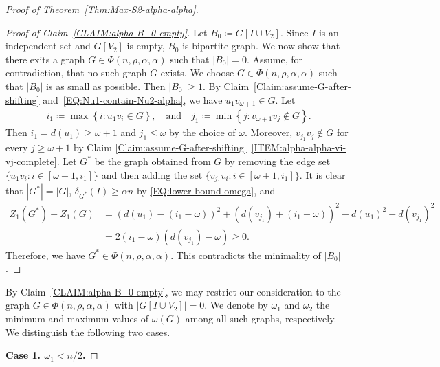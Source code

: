 \documentclass[11pt,a4paper]{article}
\begin{document}
\begin{proof}[Proof of Theorem~\ref{Thm:Max-S2-alpha-alpha}]
\begin{proof}[Proof of Claim~\ref{CLAIM:alpha-B_0-empty}]
Let $B_0\coloneqq  G[I\cup V_2]$. 
Since $I$ is an independent set and $G[V_2]$ is empty, $B_0$ is bipartite graph. 
We now show that there exits a graph $G \in \Phi(n, \rho, \alpha, \alpha)$ such that $|B_0| = 0$. 
Assume, for contradiction, that no such graph $G$ exists. 
We choose $G\in \Phi(n, \rho, \alpha, \alpha)$ such that $|B_0|$ is as small as possible. Then $|B_0|\ge 1$. 
By Claim~\ref{Claim:assume-G-after-shifting} and~\eqref{EQ:Nu1-contain-Nu2-alpha}, we have $u_1v_{\omega+1}\in G$. 
Let 
\begin{align*}
i_1 \coloneqq \max \left\{i \colon u_1v_i \in G\right\}, 
\quad \text{and} \quad
j_1\coloneqq \min\left\{j \colon v_{\omega +1}v_{j} \not\in G \right\}. 
\end{align*} 
Then $i_1 = d(u_1) \ge \omega + 1$ and $j_1 \le \omega$ by the choice of $\omega$. 
Moreover, $v_{j_1}v_j \not\in G$ for every $j \ge \omega+1$ by Claim \ref{Claim:assume-G-after-shifting}~\ref{ITEM:alpha-alpha-vi-vj-complete}. 
Let $G^{\ast}$ be the graph obtained from $G$ by removing the edge set $\{u_1 v_i \colon i \in [\omega+1,i_1]\}$ and then adding the set $\{v_{j_1} v_i \colon i \in [\omega+1,i_1]\}$. 
It is clear that $|G^{\ast}| = |G|$, $\delta_{G^{\ast}}(I)\ge \alpha n$ by \eqref{EQ:lower-bound-omega}, and
\begin{align*}
Z_{1}(G^{\ast}) - Z_{1}(G)
& = \left(d(u_1)-(i_1-\omega)\right)^2 + \left(d(v_{j_1})+(i_1-\omega)\right)^2 - d(u_1)^2 - d(v_{j_1})^2 \\
& = 2(i_1 - \omega)(d(v_{j_1}) - \omega) 
\ge 0. 
\end{align*}
Therefore, we have $G^{\ast} \in \Phi(n, \rho, \alpha, \alpha)$. 
This contradicts the minimality of $|B_0|$. 
\end{proof}%

By Claim~\ref{CLAIM:alpha-B_0-empty}, we may restrict our consideration to the graph $G \in \Phi(n, \rho, \alpha, \alpha)$ with $\left|G[I \cup V_2]\right| = 0$. 
We denote by $\omega_1$ and $\omega_2$ the minimum and maximum values of $\omega(G)$ among all such graphs, respectively. 
We distinguish the following two cases. 

\textbf{Case 1. $\omega_1 < n/2$. } 


\end{proof}
\end{document}
